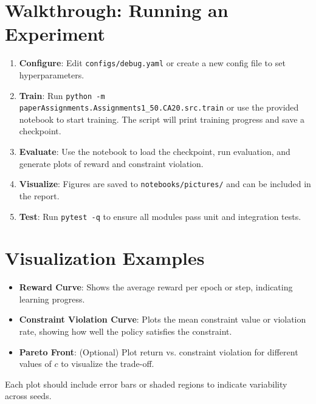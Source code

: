 \section{Walkthrough: Running an Experiment}
\begin{enumerate}
  \item \textbf{Configure}: Edit \texttt{configs/debug.yaml} or create a new config file to set hyperparameters.
  \item \textbf{Train}: Run \texttt{python -m paperAssignments.Assignments1_50.CA20.src.train} or use the provided notebook to start training. The script will print training progress and save a checkpoint.
  \item \textbf{Evaluate}: Use the notebook to load the checkpoint, run evaluation, and generate plots of reward and constraint violation.
  \item \textbf{Visualize}: Figures are saved to \texttt{notebooks/pictures/} and can be included in the report.
  \item \textbf{Test}: Run \texttt{pytest -q} to ensure all modules pass unit and integration tests.
\end{enumerate}

\section{Visualization Examples}
\begin{itemize}
  \item \textbf{Reward Curve}: Shows the average reward per epoch or step, indicating learning progress.
  \item \textbf{Constraint Violation Curve}: Plots the mean constraint value or violation rate, showing how well the policy satisfies the constraint.
  \item \textbf{Pareto Front}: (Optional) Plot return vs. constraint violation for different values of $c$ to visualize the trade-off.
\end{itemize}
Each plot should include error bars or shaded regions to indicate variability across seeds.

